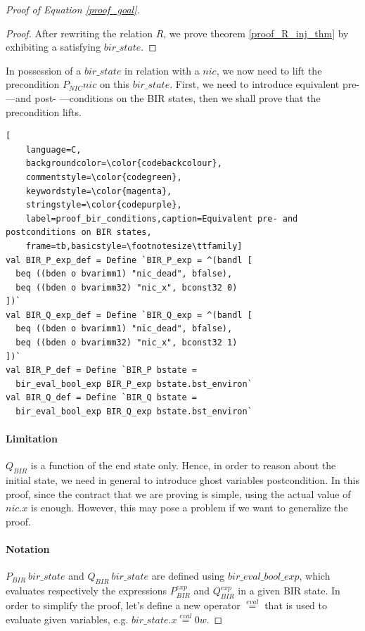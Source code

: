 \documentclass{kththesis}
\newcommand{\eqeval}{\stackrel{eval}{=}}
\begin{document}
{\begin{proof}[Proof of Equation \ref{proof_goal}]
\begin{proof}
After rewriting the relation $R$, we prove theorem \ref{proof_R_inj_thm} by exhibiting a satisfying $bir\_state$.
\end{proof}

In possession of a $bir\_state$ in relation with a $nic$, we now need to lift the precondition $P_{NIC} nic$ on this $bir\_state$. First, we need to introduce equivalent pre- ---and post- ---conditions on the BIR states, then we shall prove that the precondition lifts.

\medskip
\begin{lstlisting}[
    language=C,
    backgroundcolor=\color{codebackcolour},
    commentstyle=\color{codegreen},
    keywordstyle=\color{magenta},
    stringstyle=\color{codepurple},
    label=proof_bir_conditions,caption=Equivalent pre- and postconditions on BIR states,
    frame=tb,basicstyle=\footnotesize\ttfamily]
val BIR_P_exp_def = Define `BIR_P_exp = ^(bandl [
  beq ((bden o bvarimm1) "nic_dead", bfalse),
  beq ((bden o bvarimm32) "nic_x", bconst32 0)
])`
val BIR_Q_exp_def = Define `BIR_Q_exp = ^(bandl [
  beq ((bden o bvarimm1) "nic_dead", bfalse),
  beq ((bden o bvarimm32) "nic_x", bconst32 1)
])`
val BIR_P_def = Define `BIR_P bstate =
  bir_eval_bool_exp BIR_P_exp bstate.bst_environ`
val BIR_Q_def = Define `BIR_Q bstate =
  bir_eval_bool_exp BIR_Q_exp bstate.bst_environ`
\end{lstlisting}

\paragraph{Limitation} $Q_{BIR}$ is a function of the end state only. Hence, in order to reason about the initial state, we need in general to introduce ghost variables postcondition. In this proof, since the contract that we are proving is simple, using the actual value of $nic.x$ is enough. However, this may pose a problem if we want to generalize the proof.

\paragraph{Notation} $P_{BIR}~bir\_state$ and $Q_{BIR}~bir\_state$ are defined using $bir\_eval\_bool\_exp$, which evaluates respectively the expressions $P^{exp}_{BIR}$ and $Q^{exp}_{BIR}$ in a given BIR state. In order to simplify the proof, let's define a new operator $\eqeval$ that is used to evaluate given variables, e.g. $bir\_state.x \eqeval 0w$.
\bigskip


\end{proof}}
\end{document}
